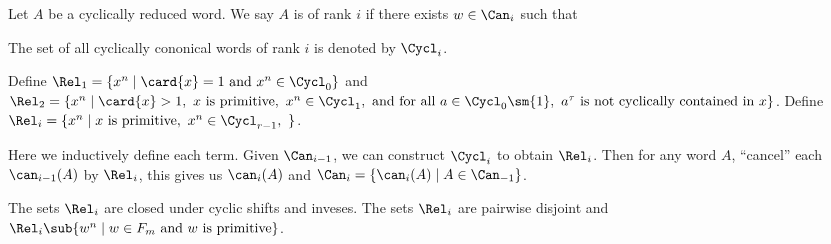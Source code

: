 \begin{convention}
    Let $A$ be a cyclically reduced word. We say $A$ is  of rank $i$ if there exists $w\in{\Can}_{i}$ such that 

    The set of all cyclically cononical words of rank $i$ is denoted by ${\Cycl}_{i}$.
\end{convention}
\begin{convention}
    Define ${\Rel}_{1}=\{{x}^{n}\mid\card{x}=1\ \text{and}\ {x}^{n}\in{\Cycl}_{0}\}$ and ${\Rel}_{2}=\{{x}^{n}\mid\card{x}>1,\ x\ \text{is primitive},\ {x}^{n}\in{\Cycl}_{1},\ \text{and for all}\ a\in{\Cycl}_{0}\sm\{1\},\ {a}^{\tau}\ \text{is not cyclically contained in}\ x\}$. Define ${\Rel}_{i}=\{{x}^{n}\mid x\ \text{is primitive},\ {x}^{n}\in{\Cycl}_{r-1},\ \}$.
\end{convention}
\par
Here we inductively define each term. Given ${\Can}_{i-1}$, we can construct ${\Cycl}_{i}$ to obtain ${\Rel}_{i}$. Then for any word $A$, ``cancel'' each ${\can}_{i-1}(A)$ by ${\Rel}_{i}$, this gives us ${\can}_{i}(A)$ and ${\Can}_{i}=\{{\can}_{i}(A)\mid A\in{\Can}_{-1}\}$.





\begin{theorem}
    The sets ${\Rel}_{i}$ are closed under cyclic shifts and inveses. The sets ${\Rel}_{i}$ are pairwise disjoint and ${\Rel}_{i}\sub\{{w}^{n}\mid w\in{F}_{m}\ \text{and}\ w\ \text{is primitive}\}$.
\end{theorem}